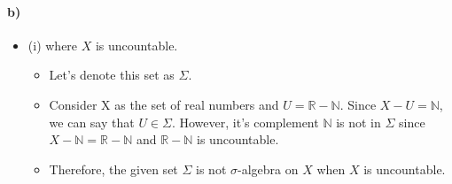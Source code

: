 \documentclass[12pt]{article}
\begin{document}
\paragraph*{b)}
\begin{itemize}
    \item (i) where $X$ is uncountable.
    \begin{itemize}
     \item Let's denote this set as $\Sigma$.
        \item Consider X as the set of real numbers and $U = \mathbb{R} - \mathbb{N}$. Since $X-U = \mathbb{N}$, we can say that $U \in \Sigma$. However, it's complement $\mathbb{N}$ is not in $\Sigma$ since $X-\mathbb{N} = \mathbb{R} - \mathbb{N}$ and $\mathbb{R} - \mathbb{N}$ is uncountable.
        \item Therefore, the given set $\Sigma$ is not $\sigma$-algebra on $X$ when $X$ is uncountable.
    \end{itemize}


\end{itemize}
\end{document}
